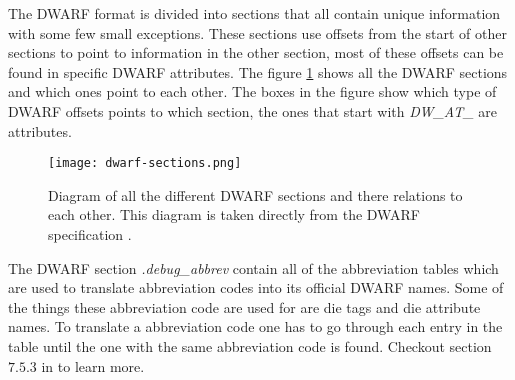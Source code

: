  


The \gls{DWARF} format is divided into sections that all contain unique information with some few small exceptions.
These sections use offsets from the start of other sections to point to information in the other section, most of these offsets can be found in specific \gls{DWARF} attributes.
The figure \ref{fig:dwarfsections} shows all the \gls{DWARF} sections and which ones point to each other.
The boxes in the figure show which type of \gls{DWARF} offsets points to which section, the ones that start with \emph{DW\_AT\_} are attributes.




\begin{figure}[h]
	\centering
	\texttt{[image: dwarf-sections.png]}
	\caption{Diagram of all the different \gls{DWARF} sections and there relations to each other. This diagram is taken directly from the \gls{DWARF} specification \cite{dwarf}.}
	\label{fig:dwarfsections}
\end{figure}


The \gls{DWARF} section \emph{.debug\_abbrev} contain all of the abbreviation tables which are used to translate abbreviation codes into its official \gls{DWARF} names.
Some of the things these abbreviation code are used for are \gls{die} tags and \gls{die} attribute names.
To translate a abbreviation code one has to go through each entry in the table until the one with the same abbreviation code is found.
Checkout section $7.5.3$ in \cite{dwarf} to learn more.


